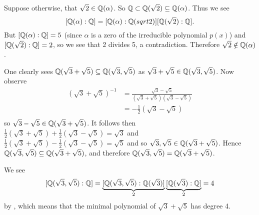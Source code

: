 \begin{questions}
\begin{partquestions}{\alph*}
\begin{partquestions}{\roman*}
            \item Suppose otherwise, that $\sqrt2 \in \mathbb{Q}(\alpha)$. So $\mathbb{Q} \subset \mathbb{Q}(\sqrt2) \subseteq \mathbb{Q}(\alpha)$. Thus we see
            \[
                [\mathbb{Q}(\alpha): \mathbb{Q}] = [\mathbb{Q}(\alpha):\mathbb{Q}(sqrt2)][\mathbb{Q}(\sqrt2):\mathbb{Q}].
            \]
            But $[\mathbb{Q}(\alpha): \mathbb{Q}] = 5$ (since $\alpha$ is a zero of the irreducible polynomial $p(x)$) and $[\mathbb{Q}(\sqrt2):\mathbb{Q}] = 2$, so we see that 2 divides 5, a contradiction. Therefore $\sqrt2 \notin \mathbb{Q}(\alpha)$.
        \end{partquestions}
    \end{partquestions}

    \item \begin{partquestions}{\roman*}
        \item One clearly sees $\mathbb{Q}(\sqrt3 + \sqrt5) \subseteq \mathbb{Q}(\sqrt3, \sqrt5)$ as $\sqrt3 + \sqrt5 \in \mathbb{Q}(\sqrt3, \sqrt5)$. Now observe
        \begin{align*}
            \left(\sqrt3+\sqrt5\right)^{-1} &= \frac{\sqrt3-\sqrt5}{\left(\sqrt3+\sqrt5\right)\left(\sqrt3-\sqrt5\right)}\\
            &= -\frac12\left(\sqrt3-\sqrt5\right)\\
        \end{align*}
        so $\sqrt3-\sqrt5 \in \mathbb{Q}(\sqrt3 + \sqrt5)$. It follows then $\frac12\left(\sqrt3 + \sqrt5\right) + \frac12\left(\sqrt3 - \sqrt5\right) = \sqrt3$ and $\frac12\left(\sqrt3 + \sqrt5\right) - \frac12\left(\sqrt3 - \sqrt5\right) = \sqrt5$ and so $\sqrt3,\sqrt5\in\mathbb{Q}(\sqrt3+\sqrt5)$. Hence $\mathbb{Q}(\sqrt3,\sqrt5)\subseteq\mathbb{Q}(\sqrt3+\sqrt5)$, and therefore $\mathbb{Q}(\sqrt3, \sqrt5) = \mathbb{Q}(\sqrt3 + \sqrt5)$.

        \item We see
        \[
            [\mathbb{Q}(\sqrt3, \sqrt5): \mathbb{Q}] = \underbrace{[\mathbb{Q}(\sqrt3, \sqrt5): \mathbb{Q}(\sqrt3)]}_2\underbrace{[\mathbb{Q}(\sqrt3):\mathbb{Q}]}_2 = 4
        \]
        by , which means that the minimal polynomial of $\sqrt3+\sqrt5$ has degree 4.
    \end{partquestions}
\end{questions}
